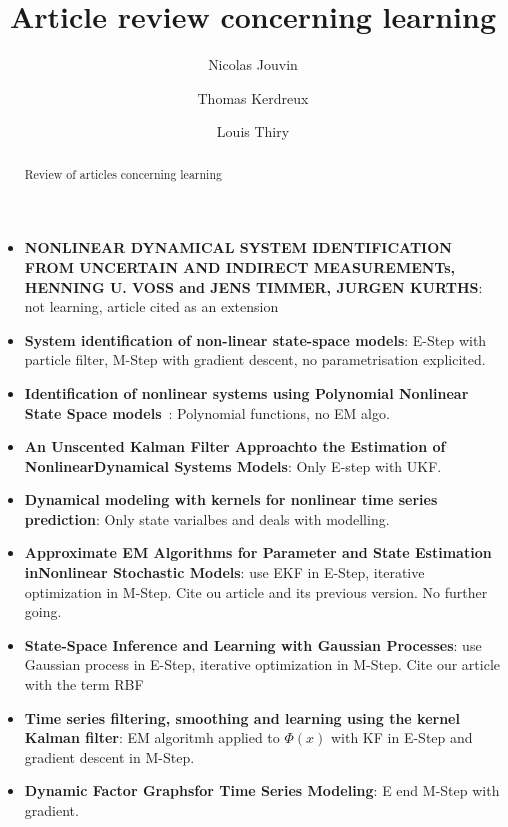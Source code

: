 \documentclass[11pt, oneside]{amsart}
\title[]{Article review concerning learning}
\author[1]{Nicolas Jouvin}
\author[2]{Thomas Kerdreux}
\author[3]{Louis Thiry}
\begin{document}
\maketitle
\begin{abstract}
  Review of articles concerning learning
\end{abstract}

\begin{itemize}
  \item \textbf{NONLINEAR DYNAMICAL SYSTEM IDENTIFICATION FROM UNCERTAIN AND INDIRECT MEASUREMENTs, HENNING U. VOSS and JENS TIMMER, JURGEN KURTHS}: not learning, article cited as an extension
  \item \textbf{System identification of non-linear state-space models}: E-Step with particle filter, M-Step with gradient descent, no parametrisation explicited.
  \item \textbf{Identification of nonlinear systems using Polynomial Nonlinear State Space models} : Polynomial functions, no EM algo.
  \item \textbf{An Unscented Kalman Filter Approachto the Estimation of NonlinearDynamical Systems Models}: Only E-step with UKF.
  \item \textbf{Dynamical modeling with kernels for nonlinear time series prediction}: Only state varialbes and deals with modelling.
  \item \textbf{Approximate EM Algorithms for Parameter and State Estimation inNonlinear Stochastic Models}: use EKF in E-Step, iterative optimization in M-Step. Cite ou article and its previous version. No further going.
  \item \textbf{State-Space Inference and Learning with Gaussian Processes}: use Gaussian process in E-Step, iterative optimization in M-Step. Cite our article with the term RBF
  \item \textbf{Time series filtering, smoothing and learning using the kernel Kalman filter}: EM algoritmh applied to $\Phi(x)$ with KF in E-Step and gradient descent in M-Step.
  \item \textbf{Dynamic Factor Graphsfor Time Series Modeling}: E end M-Step with gradient.
\end{itemize}
\end{document}
